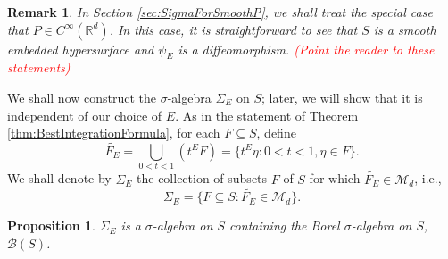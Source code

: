 \documentclass[11pt]{article}
\newtheorem{proposition}[theorem]{Proposition}
\newtheorem{remark}{Remark}
\begin{document}
\begin{remark}In Section \ref{sec:SigmaForSmoothP}, we shall treat the special case that $P\in C^{\infty}(\mathbb{R}^d)$. In this case, it is straightforward to see that $S$ is a smooth embedded hypersurface and $\psi_E$ is a diffeomorphism. \textcolor{red}{(Point the reader to these statements)}
\end{remark}

\noindent We shall now construct the $\sigma$-algebra $\Sigma_{E}$ on $S$; later, we will show that it is independent of our choice of $E$. As in the statement of Theorem \ref{thm:BestIntegrationFormula}, for each $F\subseteq S$, define
\begin{equation*}
\widetilde{F_E}=\bigcup_{0<t<1}\left(t^E F\right)=\{t^E\eta:0<t<1,\eta\in F\}. 
\end{equation*}
We shall denote by $\Sigma_{E}$ the collection of subsets $F$ of $S$ for which $\widetilde{F_E}\in\mathcal{M}_d$, i.e.,  
\begin{equation*}
\Sigma_{E}=\{F\subseteq S:\widetilde{F_E}\in\mathcal{M}_d\}.
\end{equation*}


\begin{proposition}\label{prop:BorelContainment}
$\Sigma_{E}$ is a $\sigma$-algebra on $S$ containing the Borel $\sigma$-algebra on $S$, $\mathcal{B}(S)$.
\end{proposition}
\end{document}
